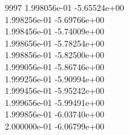 9997	1.998056e-01	-5.65524e+00	\\ 	1.998256e-01	-5.69766e+00	\\ 	1.998456e-01	-5.74009e+00	\\ 	1.998656e-01	-5.78254e+00	\\ 	1.998856e-01	-5.82500e+00	\\ 	1.999056e-01	-5.86746e+00	\\ 	1.999256e-01	-5.90994e+00	\\ 	1.999456e-01	-5.95242e+00	\\ 	1.999656e-01	-5.99491e+00	\\ 	1.999856e-01	-6.03740e+00	\\ 	2.000000e-01	-6.06799e+00	\\ \hline
